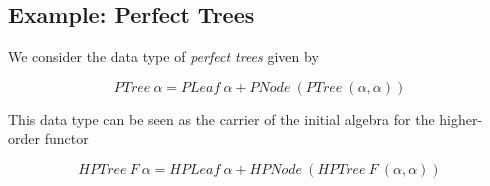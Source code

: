 \documentclass{article}[12 pt]
\theoremstyle{problemstyle}
\begin{document}
\subsection{Example: Perfect Trees}

We consider the data type of {\em perfect trees} given by 

\[\mathit{PTree}~\alpha = \mathit{PLeaf}~\alpha +
\mathit{PNode}~(\mathit{PTree}~(\alpha,\alpha))\] 

\noindent
This data type can be seen as the carrier of the initial algebra for
the higher-order functor

\[\mathit{HPTree}~F~\alpha = \mathit{HPLeaf}~\alpha +
\mathit{HPNode}~(\mathit{HPTree}~F~(\alpha,\alpha))\] 

\vspace*{0.1in}
\end{document}
